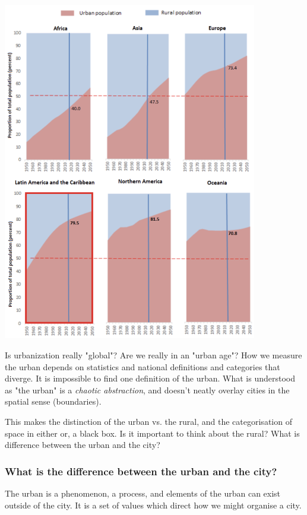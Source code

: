 \documentclass{article}
\begin{document}
\begin{center}
	\includegraphics[width=30em]{urban_rural_proportion}
\end{center}

Is urbanization really "global"? Are we really in an "urban age"? How we measure the urban depends on statistics and national definitions and categories that diverge. It is impossible to find one definition of the urban. What is understood as "the urban" is a \textit{chaotic abstraction}, and doesn't neatly overlay cities in the spatial sense (boundaries). 

This makes the distinction of the urban vs. the rural, and the categorisation of space in either or, a black box. Is it important to think about the rural? What is difference between the urban and the city?

\subsubsection{What is the difference between the urban and the city?}

The urban is a phenomenon, a process, and elements of the urban can exist outside of the city. 
It is a set of values which direct how we might organise a city.
\end{document}
